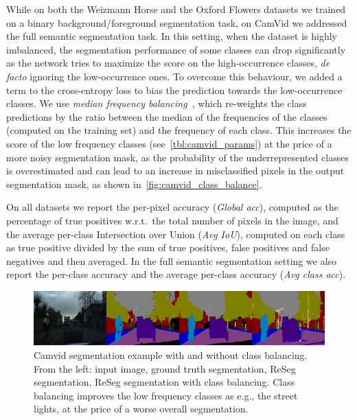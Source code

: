 While on both the Weizmann Horse and the Oxford Flowers datasets we trained on
a binary background/foreground segmentation task, on CamVid we addressed the
full semantic segmentation task. In this setting, when the dataset is highly
imbalanced, the segmentation performance of some classes can drop
significantly as the network tries to maximize the score on the high-occurrence
classes, {\em de facto} ignoring the low-occurrence ones. To overcome this behaviour,
we added a term to the cross-entropy loss to bias the prediction towards the
low-occurrence classes. We use \emph{median frequency
balancing}~\cite{Eigen2015}, which re-weights the class predictions by the
ratio between the median of the frequencies of the classes (computed on the
training set) and the frequency of each class.
This increases the score of the low frequency classes
(see~\autoref{tbl:camvid_params}) at the price of a more noisy segmentation
mask, as the probability of the underrepresented classes is overestimated and
can lead to an increase in misclassified pixels in the output segmentation
mask, as shown in~\autoref{fig:camvid_class_balance}.

On all datasets we report the per-pixel accuracy (\emph{Global acc}), computed
as the percentage of true positives w.r.t.\ the total number of pixels in the
image, and the average per-class Intersection over Union (\emph{Avg IoU}),
computed on each class as true positive divided by the sum of true positives,
false positives and false negatives and then averaged. In the full semantic
segmentation setting we also report the per-class accuracy and the average
per-class accuracy (\emph{Avg class acc}).

\begin{figure}[!htb]
    \centering
    \includegraphics[width=\textwidth]{img/camvid_classbal_diff.png}%
    \caption{Camvid segmentation example with and without class balancing. From
        the left: input image, ground truth segmentation, ReSeg segmentation,
        ReSeg segmentation with class balancing. Class balancing improves the
        low frequency classes as e.g., the street lights, at the price of a
        worse overall segmentation.}
    \label{fig:camvid_class_balance}
\end{figure}


